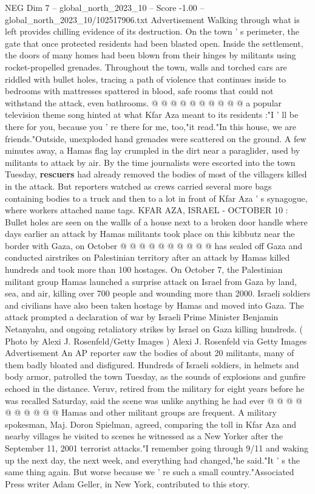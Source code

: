 \begin{textsample}{NEG Dim 7 – global\_north\_2023\_10 – Score -1.00 – global\_north\_2023\_10/102517906.txt}
Advertisement Walking through what is left provides chilling evidence of its destruction.
On the town ' s perimeter, the gate that once protected residents had been blasted open.
Inside the settlement, the doors of many homes had been blown from their hinges by militants using rocket-propelled grenades.
Throughout the town, walls and torched cars are riddled with bullet holes, tracing a path of violence that continues inside to bedrooms with mattresses spattered in blood, safe rooms that could not withstand the attack, even bathrooms. @ @ @ @ @ @ @ @ @ @ a popular television theme song hinted at what Kfar Aza meant to its residents :"I ' ll be there for you, because you ' re there for me, too,"it read."In this house, we are friends."Outside, unexploded hand grenades were scattered on the ground.
A few minutes away, a Hamas flag lay crumpled in the dirt near a paraglider, used by militants to attack by air.
By the time journalists were escorted into the town Tuesday, \textbf{rescuers} had already removed the bodies of most of the villagers killed in the attack.
But reporters watched as crews carried several more bags containing bodies to a truck and then to a lot in front of Kfar Aza ' s synagogue, where workers attached name tags.
KFAR AZA, ISRAEL - OCTOBER 10 : Bullet holes are seen on the wallls of a house next to a broken door handle where days earlier an attack by Hamas militants took place on this kibbutz near the border with Gaza, on October @ @ @ @ @ @ @ @ @ @ has sealed off Gaza and conducted airstrikes on Palestinian territory after an attack by Hamas killed hundreds and took more than 100 hostages.
On October 7, the Palestinian militant group Hamas launched a surprise attack on Israel from Gaza by land, sea, and air, killing over 700 people and wounding more than 2000.
Israeli soldiers and civilians have also been taken hostage by Hamas and moved into Gaza.
The attack prompted a declaration of war by Israeli Prime Minister Benjamin Netanyahu, and ongoing retaliatory strikes by Israel on Gaza killing hundreds. ( Photo by Alexi J.
Rosenfeld/Getty Images ) Alexi J.
Rosenfeld via Getty Images Advertisement An AP reporter saw the bodies of about 20 militants, many of them badly bloated and disfigured.
Hundreds of Israeli soldiers, in helmets and body armor, patrolled the town Tuesday, as the sounds of explosions and gunfire echoed in the distance.
Veruv, retired from the military for eight years before he was recalled Saturday, said the scene was unlike anything he had ever @ @ @ @ @ @ @ @ @ @ Hamas and other militant groups are frequent.
A military spokesman, Maj.
Doron Spielman, agreed, comparing the toll in Kfar Aza and nearby villages he visited to scenes he witnessed as a New Yorker after the September 11, 2001 terrorist attacks."I remember going through 9/11 and waking up the next day, the next week, and everything had changed,"he said."It ' s the same thing again.
But worse because we ' re such a small country."Associated Press writer Adam Geller, in New York, contributed to this story.

\end{textsample}
